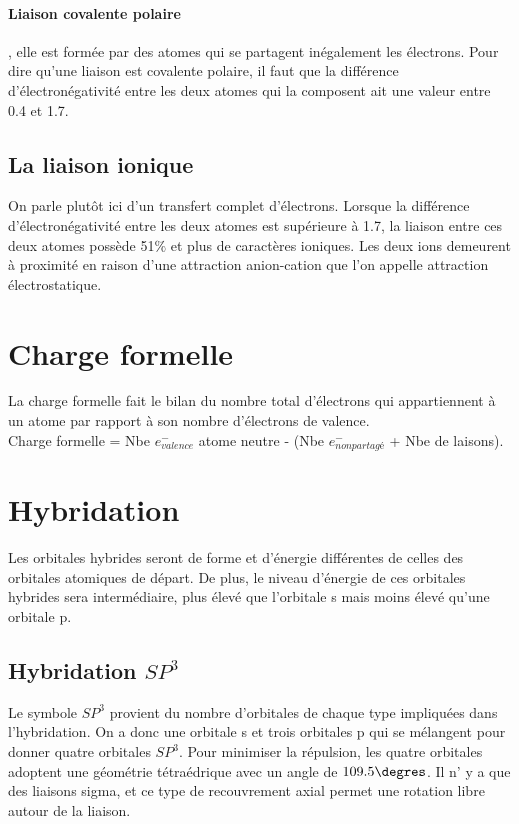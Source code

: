 \paragraph{Liaison covalente polaire}, elle est formée par des atomes qui se partagent inégalement les électrons.
Pour dire qu'une liaison est covalente polaire, il faut que la différence d'électronégativité entre les deux atomes qui la composent ait une valeur entre 0.4 et 1.7.

\subsection{La liaison ionique}
On parle plutôt ici d'un transfert complet d'électrons.
Lorsque la différence d'électronégativité entre les deux atomes est supérieure à 1.7, la liaison entre ces deux atomes possède 51$\%$ et plus de caractères ioniques.
Les deux ions demeurent à proximité en raison d'une attraction anion-cation que l'on appelle attraction électrostatique.
\section{Charge formelle}
La charge formelle fait le bilan du nombre total d'électrons qui appartiennent à un atome par rapport à son nombre d'électrons de valence.
\\
Charge formelle  = Nbe $e^-_{ valence }$ atome neutre - (Nbe $e^-_{non partagé}$  + Nbe de laisons).
\section{Hybridation}
Les orbitales hybrides seront de forme et d'énergie différentes de celles des orbitales atomiques de départ.
De plus, le niveau d'énergie de ces orbitales hybrides sera intermédiaire, plus élevé que l'orbitale s mais moins élevé qu'une orbitale p.

\subsection{Hybridation $SP^3$}
Le symbole $SP^3$ provient du nombre d'orbitales de chaque type impliquées dans l'hybridation.
On a donc une orbitale s et trois orbitales p qui se mélangent pour donner quatre orbitales $SP^3$.
Pour minimiser la répulsion, les quatre orbitales adoptent une géométrie tétraédrique avec un angle de $109.5\degres$.
Il n' y a que des liaisons sigma, et  ce type de recouvrement axial permet une rotation libre autour de la liaison.

